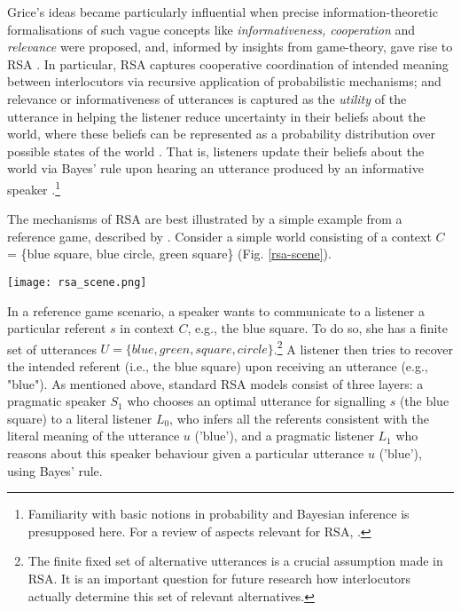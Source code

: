Grice’s ideas became particularly influential when precise information-theoretic formalisations of such vague concepts like \emph{informativeness, cooperation} and \emph{relevance} were proposed, and, informed by insights from game-theory, gave rise to RSA \parencite{frank2012predicting}.
In particular, RSA captures cooperative coordination of intended meaning between interlocutors via recursive application of probabilistic mechanisms; and relevance or informativeness of utterances is captured as the \emph{utility} of the utterance in helping the listener reduce uncertainty in their beliefs about the world, where these beliefs can be represented as a probability distribution over possible states of the world \parencite[as advocated by e.g.][]{tenenbaum2011grow}.  
That is, listeners update their beliefs about the world via Bayes' rule upon hearing an utterance produced by an informative speaker \parencite{frank2012predicting}.\footnote{Familiarity with basic notions in probability and Bayesian inference is presupposed here. For a review of aspects relevant for RSA, \textcite[see e.g.][]{lassiter2017adjectival}.}

The mechanisms of RSA are best illustrated by a simple example from a reference game, described by \textcite{frank2012predicting}.
Consider a simple world consisting of a context $C$ = \{blue square, blue circle, green square\} (Fig. \ref{rsa-scene}).
\begin{figure*}[t]
	\begin{center}
		\texttt{[image: rsa\_scene.png]}
	\end{center}
	\vspace{-0.3cm}
	\caption{A simple reference resolution example scenario: the context $C$ consists of three possible referents \parencite{frank2012predicting}}
	\label{rsa-scene}
\end{figure*}
In a reference game scenario, a speaker wants to communicate to a listener a particular referent $s$ in context $C$, e.g., the blue square. To do so, she has a finite set of utterances $U = \{blue, green, square, circle\}$.\footnote{The finite fixed set of alternative utterances is a crucial assumption made in RSA. It is an important question for future research how interlocutors actually determine this set of relevant alternatives.} A listener then tries to recover the intended referent (i.e., the blue square) upon receiving an utterance (e.g., "blue"). 
As mentioned above, standard RSA models consist of three layers: a pragmatic speaker $S_1$ who chooses an optimal utterance for signalling $s$ (the blue square) to a literal listener $L_0$, who infers all the referents consistent with the literal meaning of the utterance $u$ ('blue'), and a pragmatic listener $L_1$ who reasons about this speaker behaviour given a particular utterance $u$ ('blue'), using Bayes' rule.

